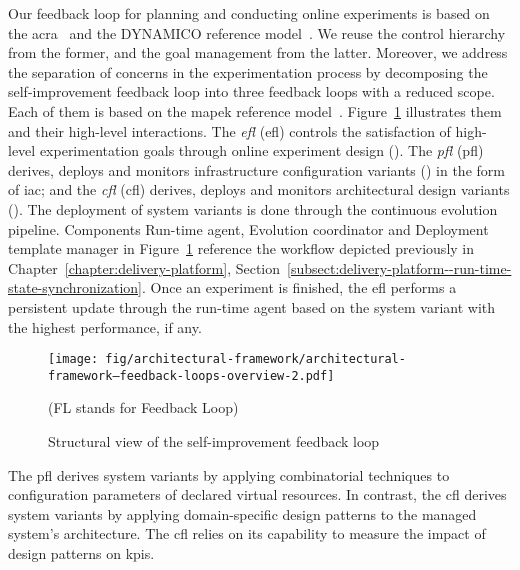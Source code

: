 Our feedback loop for planning and conducting online experiments is based on the \gls{acra}~\cite{ibm-2005-architectural} and the DYNAMICO reference model~\cite{villegas-2013-dynamico}. We reuse the control hierarchy from the former, and the goal management from the latter. Moreover, we address the separation of concerns in the experimentation process by decomposing the self-improvement feedback loop into three feedback loops with a reduced scope. Each of them is based on the \gls{mapek} reference model~\cite{kephart-2003-vision}. Figure~\ref{fig:architectural-framework--feedback-loops-overview} illustrates them and their high-level interactions. The \emph{\acrlong{efl}} (\acrshort{efl}) controls the satisfaction of high-level experimentation goals through online experiment design (). The \emph{\acrlong{pfl}} (\acrshort{pfl}) derives, deploys and monitors infrastructure configuration variants () in the form of \gls{iac}; and the \emph{\acrlong{cfl}} (\acrshort{cfl}) derives, deploys and monitors architectural design variants (). The deployment of system variants is done through the continuous evolution pipeline. Components Run-time agent, Evolution coordinator and Deployment template manager in Figure~\ref{fig:architectural-framework--feedback-loops-overview} reference the workflow depicted previously in Chapter~\ref{chapter:delivery-platform}, Section~\ref{subsect:delivery-platform--run-time-state-synchronization}. Once an experiment is finished, the \gls{efl} performs a persistent update through the run-time agent based on the system variant with the highest performance, if any.

\begin{figure}[p]
	\centering
	\texttt{[image: fig/architectural-framework/architectural-framework--feedback-loops-overview-2.pdf]}
	\caption{Structural view of the self-improvement feedback loop}
	\label{fig:architectural-framework--feedback-loops-overview}
	(FL stands for Feedback Loop)
\end{figure}

The \gls{pfl} derives system variants by applying combinatorial techniques to configuration parameters of declared virtual resources. In contrast, the \gls{cfl} derives system variants by applying domain-specific design patterns to the managed system's architecture. The \gls{cfl} relies on its capability to measure the impact of design patterns on \glspl{kpi}.

